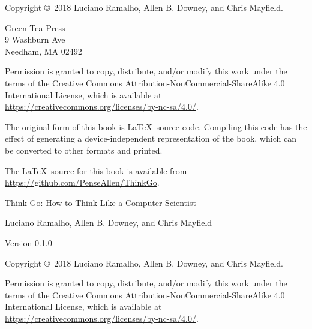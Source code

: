 \documentclass[12pt]{book}
\newcommand{\thetitle}{Think Go}
\newcommand{\thesubtitle}{How to Think Like a Computer Scientist}
\newcommand{\theauthors}{Luciano Ramalho, Allen B. Downey, and Chris Mayfield}
\newcommand{\theversion}{0.1.0}
\theoremstyle{exercise}
\begin{document}
\begin{latexonly}
\newpage
\thispagestyle{empty}

Copyright \copyright ~2018 \theauthors.

\vspace{0.2in}

\begin{flushleft}
Green Tea Press \\
9 Washburn Ave \\
Needham, MA 02492
\end{flushleft}

Permission is granted to copy, distribute, and/or modify this work under the terms of the Creative Commons Attribution-NonCommercial-ShareAlike 4.0 International License, which is available at \url{https://creativecommons.org/licenses/by-nc-sa/4.0/}.

The original form of this book is \LaTeX\ source code.
Compiling this code has the effect of generating a device-independent representation of the book, which can be converted to other formats and printed.

The \LaTeX\ source for this book is available from \url{https://github.com/PenseAllen/ThinkGo}.


\cleardoublepage
\setcounter{tocdepth}{1}
\tableofcontents

\end{latexonly}


\begin{htmlonly}

\vspace{1em}

{\Large \thetitle: \thesubtitle}

{\large \theauthors}

Version \theversion

\vspace{1em}

Copyright \copyright ~2018 \theauthors.

Permission is granted to copy, distribute, and/or modify this work under the terms of the Creative Commons Attribution-NonCommercial-ShareAlike 4.0 International License, which is available at \url{https://creativecommons.org/licenses/by-nc-sa/4.0/}.

\vspace{1em}

\end{htmlonly}
\end{document}
